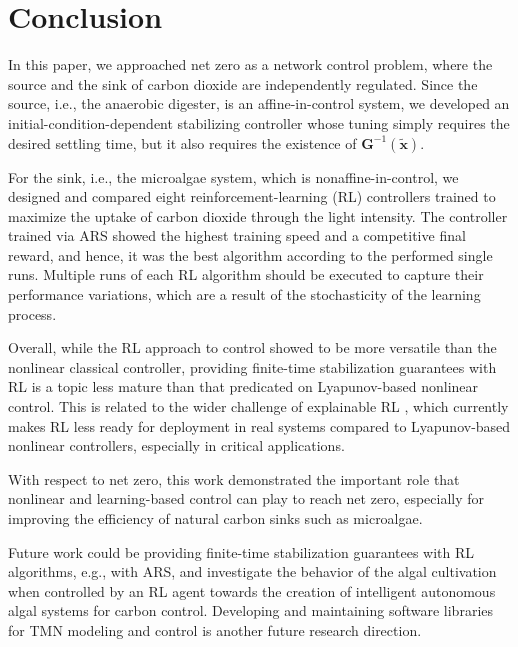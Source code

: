 \documentclass[lettersize,journal]{IEEEtran}
\begin{document}
\section{Conclusion}\label{sec:concl}
In this paper, we approached net zero as a network control problem, where the source and the sink of carbon dioxide are independently regulated. Since the source, i.e., the anaerobic digester, is an affine-in-control system, we developed an initial-condition-dependent stabilizing controller whose tuning simply requires the desired settling time, but it also requires the existence of $\bm{G}^{-1}(\tilde{\bm{x}})$.

For the sink, i.e., the microalgae system, which is nonaffine-in-control, we designed and compared eight reinforcement-learning (RL) controllers trained to maximize the uptake of carbon dioxide through the light intensity. The controller trained via ARS showed the highest training speed and a competitive final reward, and hence, it was the best algorithm according to the performed single runs. Multiple runs of each RL algorithm should be executed to capture their performance variations, which are a result of the stochasticity of the learning process.     

Overall, while the RL approach to control showed to be more versatile than the nonlinear classical controller, providing finite-time stabilization guarantees with RL is a topic less mature than that predicated on Lyapunov-based nonlinear control. This is related to the wider challenge of explainable RL \cite{milani2024explainable}, which currently makes RL less ready for deployment in real systems compared to Lyapunov-based nonlinear controllers, especially in critical applications. 

With respect to net zero, this work demonstrated the important role that nonlinear and learning-based control can play to reach net zero, especially for improving the efficiency of natural carbon sinks such as microalgae. 

Future work could be providing finite-time stabilization guarantees with RL algorithms, e.g., with ARS, and investigate the behavior of the algal cultivation when controlled by an RL agent towards the creation of intelligent autonomous algal systems for carbon control. Developing and maintaining software libraries for TMN modeling and control is another future research direction. 













\ifCLASSOPTIONcaptionsoff
  \newpage
\fi







\end{document}
